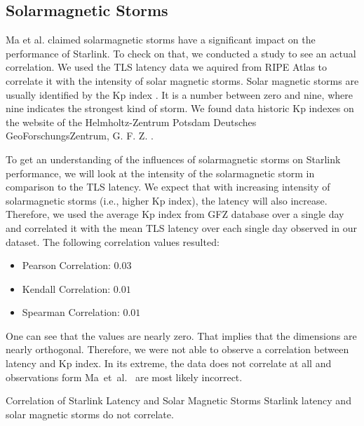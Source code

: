 \subsection{Solarmagnetic Storms} \label{sec:solarmagnetic-storms}

Ma et al. \cite{DBLP:conf/infocom/MaCZCML23} claimed solarmagnetic storms have
a significant impact on the performance of Starlink. To check on that, we
conducted a study to see an actual correlation. We used the TLS latency data we
aquired from RIPE Atlas to correlate it with the intensity of solar magnetic
storms. Solar magnetic storms are usually identified by the Kp index
\cite{Bartels1957}. It is a number between zero and nine, where nine indicates
the strongest kind of storm. We found data historic Kp indexes on the website
of the Helmholtz-Zentrum Potsdam Deutsches GeoForschungsZentrum, G. F. Z.
\cite{GFZ2023}.

To get an understanding of the influences of solarmagnetic storms on Starlink
performance, we will look at the intensity of the solarmagnetic storm in
comparison to the TLS latency. We expect that with increasing intensity of
solarmagnetic storms (i.e., higher Kp index), the latency will also increase.
Therefore, we used the average Kp index from GFZ database over a single day and
correlated it with the mean TLS latency over each single day observed in our
dataset. The following correlation values resulted:

\begin{itemize}
	\item Pearson Correlation: $0.03$
	\item Kendall Correlation: $0.01$
	\item Spearman Correlation: $0.01$
\end{itemize}

One can see that the values are nearly zero. That implies that the dimensions
are nearly orthogonal. Therefore, we were not able to observe a correlation
between latency and Kp index. In its extreme, the data does not correlate at
all and observations form Ma~et~al.~\cite{DBLP:conf/infocom/MaCZCML23} are most
likely incorrect.

\begin{takeaway}{Correlation of Starlink Latency and Solar Magnetic Storms}
	Starlink latency and solar magnetic storms do not correlate.
\end{takeaway}

